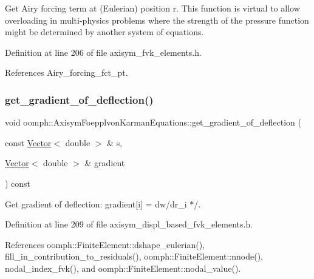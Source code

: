 Get Airy forcing term at (Eulerian) position r. This function is virtual to allow overloading in multi-\/physics problems where the strength of the pressure function might be determined by another system of equations. 



Definition at line 206 of file axisym\+\_\+fvk\+\_\+elements.\+h.



References Airy\+\_\+forcing\+\_\+fct\+\_\+pt.

\mbox{\label{classoomph_1_1AxisymFoepplvonKarmanEquations_a564c34e37df2ed58d16903221528e94c}} 
\subsubsection{\texorpdfstring{get\+\_\+gradient\+\_\+of\+\_\+deflection()}{get\_gradient\_of\_deflection()}\hspace{0.1cm}{\footnotesize\ttfamily [1/2]}}
{\footnotesize\ttfamily void oomph\+::\+Axisym\+Foepplvon\+Karman\+Equations\+::get\+\_\+gradient\+\_\+of\+\_\+deflection (\begin{DoxyParamCaption}\item[{const \hyperlink{classoomph_1_1Vector}{Vector}$<$ double $>$ \&}]{s,  }\item[{\hyperlink{classoomph_1_1Vector}{Vector}$<$ double $>$ \&}]{gradient }\end{DoxyParamCaption}) const\hspace{0.3cm}{\ttfamily [inline]}}



Get gradient of deflection\+: gradient\mbox{[}i\mbox{]} = dw/dr\+\_\+i $\ast$/. 



Definition at line 209 of file axisym\+\_\+displ\+\_\+based\+\_\+fvk\+\_\+elements.\+h.



References oomph\+::\+Finite\+Element\+::dshape\+\_\+eulerian(), fill\+\_\+in\+\_\+contribution\+\_\+to\+\_\+residuals(), oomph\+::\+Finite\+Element\+::nnode(), nodal\+\_\+index\+\_\+fvk(), and oomph\+::\+Finite\+Element\+::nodal\+\_\+value().

